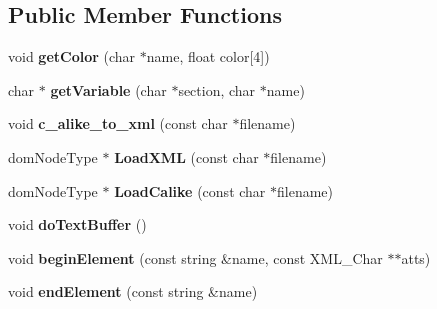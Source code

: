 \subsection*{Public Member Functions}
\begin{DoxyCompactItemize}
\item 
void {\bfseries get\+Color} (char $\ast$name, float color\mbox{[}4\mbox{]})\hypertarget{classeasyDomFactory_a2ee4a61364d6891caf5f600a506270db}{}\label{classeasyDomFactory_a2ee4a61364d6891caf5f600a506270db}

\item 
char $\ast$ {\bfseries get\+Variable} (char $\ast$section, char $\ast$name)\hypertarget{classeasyDomFactory_a572ca37a3ef70969d289bbc8daddeb3c}{}\label{classeasyDomFactory_a572ca37a3ef70969d289bbc8daddeb3c}

\item 
void {\bfseries c\+\_\+alike\+\_\+to\+\_\+xml} (const char $\ast$filename)\hypertarget{classeasyDomFactory_a50dfdbde0252ba77493370f8a02b1722}{}\label{classeasyDomFactory_a50dfdbde0252ba77493370f8a02b1722}

\item 
dom\+Node\+Type $\ast$ {\bfseries Load\+X\+ML} (const char $\ast$filename)\hypertarget{classeasyDomFactory_a94e57295429bf3afdfb2cb3a096501d8}{}\label{classeasyDomFactory_a94e57295429bf3afdfb2cb3a096501d8}

\item 
dom\+Node\+Type $\ast$ {\bfseries Load\+Calike} (const char $\ast$filename)\hypertarget{classeasyDomFactory_afecb6103b2fa7e0a25ae02f6560f55c7}{}\label{classeasyDomFactory_afecb6103b2fa7e0a25ae02f6560f55c7}

\item 
void {\bfseries do\+Text\+Buffer} ()\hypertarget{classeasyDomFactory_a9a12778b23a93196658415a9ec1c9fe4}{}\label{classeasyDomFactory_a9a12778b23a93196658415a9ec1c9fe4}

\item 
void {\bfseries begin\+Element} (const string \&name, const X\+M\+L\+\_\+\+Char $\ast$$\ast$atts)\hypertarget{classeasyDomFactory_a9c8a2ae3d673c61f85a200214bb846cc}{}\label{classeasyDomFactory_a9c8a2ae3d673c61f85a200214bb846cc}

\item 
void {\bfseries end\+Element} (const string \&name)\hypertarget{classeasyDomFactory_ae176e5701a331924085fc59d237c5366}{}\label{classeasyDomFactory_ae176e5701a331924085fc59d237c5366}

\end{DoxyCompactItemize}
